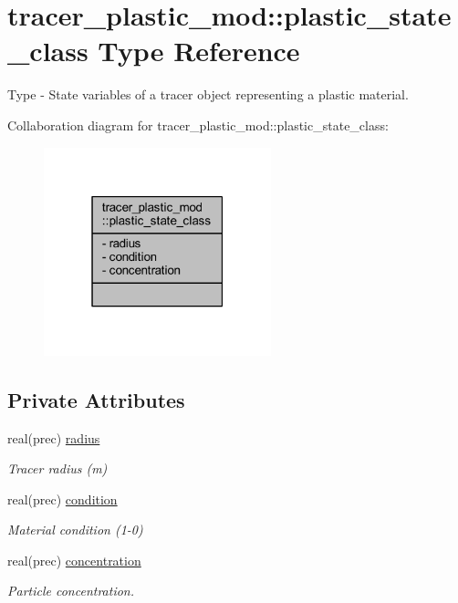 \hypertarget{structtracer__plastic__mod_1_1plastic__state__class}{}\section{tracer\+\_\+plastic\+\_\+mod\+:\+:plastic\+\_\+state\+\_\+class Type Reference}
\label{structtracer__plastic__mod_1_1plastic__state__class}


Type -\/ State variables of a tracer object representing a plastic material.  




Collaboration diagram for tracer\+\_\+plastic\+\_\+mod\+:\+:plastic\+\_\+state\+\_\+class\+:
\nopagebreak
\begin{figure}[H]
\begin{center}
\leavevmode
\includegraphics[width=187pt]{structtracer__plastic__mod_1_1plastic__state__class__coll__graph}
\end{center}
\end{figure}
\subsection*{Private Attributes}
\begin{DoxyCompactItemize}
\item 
real(prec) \mbox{\hyperlink{structtracer__plastic__mod_1_1plastic__state__class_a597b5dbe3ba58a0d58d7897fbadaea34}{radius}}
\begin{DoxyCompactList}\small\item\em Tracer radius (m) \end{DoxyCompactList}\item 
real(prec) \mbox{\hyperlink{structtracer__plastic__mod_1_1plastic__state__class_afd1aa02ed79b13a44724f5bd550debb7}{condition}}
\begin{DoxyCompactList}\small\item\em Material condition (1-\/0) \end{DoxyCompactList}\item 
real(prec) \mbox{\hyperlink{structtracer__plastic__mod_1_1plastic__state__class_a5eb0b91416c97191e62c5710beba6f8d}{concentration}}
\begin{DoxyCompactList}\small\item\em Particle concentration. \end{DoxyCompactList}\end{DoxyCompactItemize}



